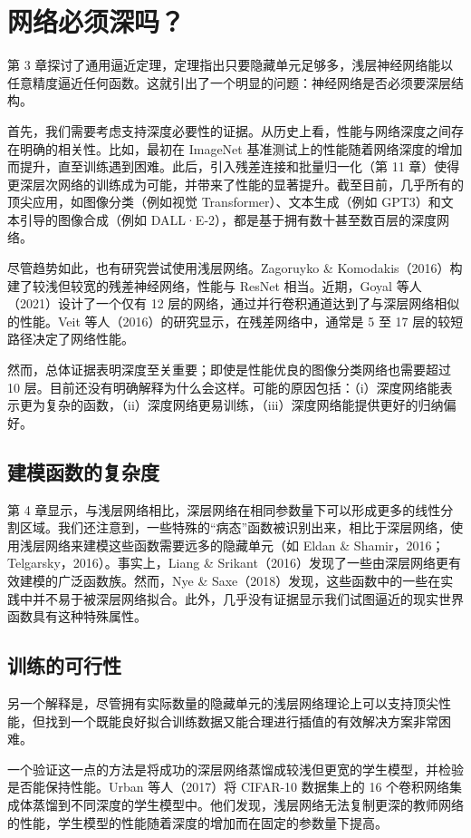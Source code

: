 \section{网络必须深吗？}
第 3 章探讨了通用逼近定理，定理指出只要隐藏单元足够多，浅层神经网络能以任意精度逼近任何函数。这就引出了一个明显的问题：神经网络是否必须要深层结构。

首先，我们需要考虑支持深度必要性的证据。从历史上看，性能与网络深度之间存在明确的相关性。比如，最初在 ImageNet 基准测试上的性能随着网络深度的增加而提升，直至训练遇到困难。此后，引入残差连接和批量归一化（第 11 章）使得更深层次网络的训练成为可能，并带来了性能的显著提升。截至目前，几乎所有的顶尖应用，如图像分类（例如视觉 Transformer）、文本生成（例如 GPT3）和文本引导的图像合成（例如 DALL·E-2），都是基于拥有数十甚至数百层的深度网络。

尽管趋势如此，也有研究尝试使用浅层网络。Zagoruyko \& Komodakis（2016）构建了较浅但较宽的残差神经网络，性能与 ResNet 相当。近期，Goyal 等人（2021）设计了一个仅有 12 层的网络，通过并行卷积通道达到了与深层网络相似的性能。Veit 等人（2016）的研究显示，在残差网络中，通常是 5 至 17 层的较短路径决定了网络性能。

然而，总体证据表明深度至关重要；即使是性能优良的图像分类网络也需要超过 10 层。目前还没有明确解释为什么会这样。可能的原因包括：（i）深度网络能表示更为复杂的函数，（ii）深度网络更易训练，（iii）深度网络能提供更好的归纳偏好。


\subsection{建模函数的复杂度}
第 4 章显示，与浅层网络相比，深层网络在相同参数量下可以形成更多的线性分割区域。我们还注意到，一些特殊的“病态”函数被识别出来，相比于深层网络，使用浅层网络来建模这些函数需要远多的隐藏单元（如 Eldan \& Shamir，2016；Telgarsky，2016）。事实上，Liang \& Srikant（2016）发现了一些由深层网络更有效建模的广泛函数族。然而，Nye \& Saxe（2018）发现，这些函数中的一些在实践中并不易于被深层网络拟合。此外，几乎没有证据显示我们试图逼近的现实世界函数具有这种特殊属性。

\subsection{训练的可行性}
另一个解释是，尽管拥有实际数量的隐藏单元的浅层网络理论上可以支持顶尖性能，但找到一个既能良好拟合训练数据又能合理进行插值的有效解决方案非常困难。

一个验证这一点的方法是将成功的深层网络蒸馏成较浅但更宽的学生模型，并检验是否能保持性能。Urban 等人（2017）将 CIFAR-10 数据集上的 16 个卷积网络集成体蒸馏到不同深度的学生模型中。他们发现，浅层网络无法复制更深的教师网络的性能，学生模型的性能随着深度的增加而在固定的参数量下提高。

